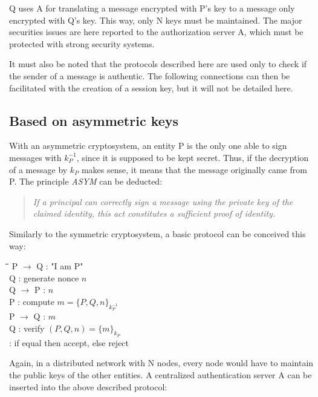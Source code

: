 Q uses A for translating a message encrypted with P's key to a message only encrypted with Q's key. This way, only N keys must be maintained. The major securities issues are here reported to the authorization server A, which must be protected with strong security systems.

It must also be noted that the protocols described here are used only to check if the sender of a message is authentic. The following connections can then be facilitated with the creation of a session key, but it will not be detailed here.

\subsection{Based on asymmetric keys}
With an asymmetric cryptosystem, an entity P is the only one able to sign messages with $k_{P}^{-1}$, since it is supposed to be kept secret. Thus, if the decryption of a message by $k_{P}$ makes sense, it means that the message originally came from P. The principle \emph{ASYM} can be deducted:

\begin{quote}
	\textit{If a principal can correctly sign a message using the private key of the claimed identity, this act constitutes a sufficient proof of identity.}
\end{quote}

Similarly to the symmetric cryptosystem, a basic protocol can be conceived this way:

\begin{tabbing}
	\hspace{4em}\=\hspace{4em}\=\hspace{2em}\=\kill
	\>  P $\rightarrow$ Q\>  : \> "I am P" \\
	\>  Q  \>  : \> generate nonce $n$	\\
	\>  Q $\rightarrow$ P \>  : \> $n$ \\
	\>  P  \>  : \> compute $m = \lbrace P, Q, n \rbrace_{k_{P}^{-1}}$ 				\\
	\>  P $\rightarrow$ Q \>  : \> $m$ \\
	\>  Q \>  : \> verify $(P,Q,n) = \lbrace m \rbrace_{k_{P}}$ \\
	\>    \>  : \> if equal then accept, else reject \\
\end{tabbing} 

Again, in a distributed network with N nodes, every node would have to maintain the public keys of the other entities. A centralized authentication server A can be inserted into the above described protocol:

